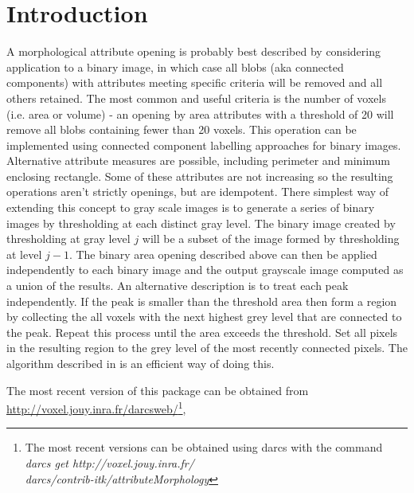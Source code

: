 \documentclass{InsightArticle}
\begin{document}
\section{Introduction}
A morphological attribute opening is probably best described by
considering application to a binary image, in which case all blobs
(aka connected components) with attributes meeting specific criteria
will be removed and all others retained. The most common and useful
criteria is the number of voxels (i.e. area or volume) - an opening by
area attributes with a threshold of 20 will remove all blobs
containing fewer than 20 voxels. This operation can be implemented
using connected component labelling approaches for binary
images. Alternative attribute measures are possible, including
perimeter and minimum enclosing rectangle\cite{Breen96}. Some of these
attributes are not increasing so the resulting operations aren't
strictly openings, but are idempotent.  There simplest way of
extending this concept to gray scale images is to generate a series of
binary images by thresholding at each distinct gray level. The binary
image created by thresholding at gray level $j$ will be a subset of
the image formed by thresholding at level $j-1$. The binary area
opening described above can then be applied independently to each
binary image and the output grayscale image computed as a union of the
results.  An alternative description is to treat each peak
independently. If the peak is smaller than the threshold area then
form a region by collecting the all voxels with the next highest grey
level that are connected to the peak. Repeat this process until the
area exceeds the threshold. Set all pixels in the resulting region to
the grey level of the most recently connected pixels. The algorithm
described in \cite{meijster02} is an efficient way of doing this.

The most recent version of this package can be obtained from
\url{http://voxel.jouy.inra.fr/darcsweb/}\footnote{The most recent
versions can be obtained using darcs \cite{DarcsWebSite} with the
command {\em darcs get
http://voxel.jouy.inra.fr/\\darcs/contrib-itk/attributeMorphology}},
\end{document}
